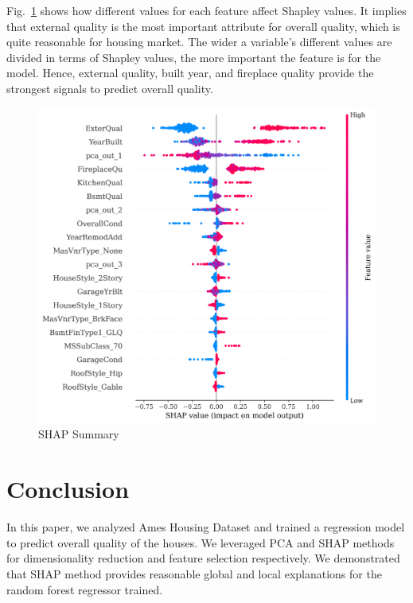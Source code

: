 \documentclass[conference]{IEEEtran}
\begin{document}
Fig.~\ref{fig:shap-summary} shows how different values for each feature affect Shapley values. 
It implies that external quality is the most important attribute 
for overall quality, which is quite reasonable for housing market. The wider a variable's
different values are divided in terms of Shapley values, the more important the feature
is for the model. Hence, external quality, built year, and fireplace quality provide
the strongest signals to predict overall quality.
\begin{figure}[htbp]
    \centerline{\includegraphics[width = 0.5 \textwidth]{shap-summary.png}}
    \caption{SHAP Summary}
    \label{fig:shap-summary}
\end{figure}

\section{Conclusion}

In this paper, we analyzed Ames Housing Dataset and trained a regression model 
to predict overall quality of the houses. We leveraged PCA and SHAP methods
for dimensionality reduction and feature selection respectively. We demonstrated that
SHAP method provides reasonable global and local explanations for the random forest
regressor trained.

\clearpage



\end{document}
